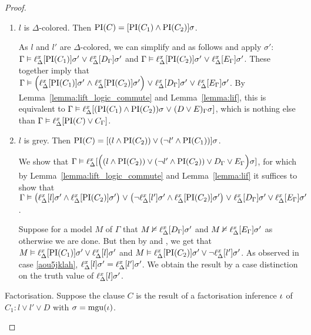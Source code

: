 {\begin{proof}
\begin{description}
\begin{enumerate}
				\item $l$ is $\Delta$-colored. Then $\operatorname{PI}(C) = [\operatorname{PI}(C_1) \land \operatorname{PI}(C_2)]\sigma$.

					As $l$ and $l'$ are $\Delta$-colored, we can simplify \markA{} and \markB{} as follows and apply $\sigma'$:
					$\Gamma \vDash \ell_{\Delta}^{x}[\operatorname{PI}(C_1)]\sigma' \;{\lor}\; \ell_{\Delta}^{x}[D_\Gamma]\sigma' $ and $\Gamma \vDash \ell_{\Delta}^{x}[\operatorname{PI}(C_2)]\sigma' \;{\lor}\; \ell_{\Delta}^{x}[E_\Gamma]\sigma'$.
					These together imply that 
					$\Gamma \vDash \Big(\ell_{\Delta}^{x}[\operatorname{PI}(C_1)]\sigma' \;{\land}\; \ell_{\Delta}^{x}[\operatorname{PI}(C_2)]\sigma'\Big) \;{\lor}\;\allowbreak \ell_{\Delta}^{x}[D_\Gamma]\sigma' \;{\lor}\;\allowbreak \ell_{\Delta}^{x}[E_\Gamma]\sigma'$.
					By Lemma~\ref{lemma:lift_logic_commute} and Lemma~\ref{lemma:lif}, this is equivalent to 
					$\Gamma \vDash \ell_{\Delta}^{x}[(\operatorname{PI}(C_1) \land \operatorname{PI}(C_2))\sigma \;{\lor}\; (D \lor E)_\Gamma\sigma]$, which is nothing else than
					$\Gamma \vDash \ell_{\Delta}^{x}[\operatorname{PI}(C) \lor C_\Gamma]$.

				\item $l$ is grey. Then $\operatorname{PI}(C) = [(l \land \operatorname{PI}(C_2) ) \lor (\lnot l' \land \operatorname{PI}(C_1))]\sigma$.

					We show that $\Gamma \vDash\allowbreak \ell_{\Delta}^{x}[ \Big((l \land \operatorname{PI}(C_2) ) \lor\allowbreak (\lnot l' \land \operatorname{PI}(C_2)) \lor D_\Gamma \lor E_\Gamma\Big)\sigma]$, for which by Lemma~\ref{lemma:lift_logic_commute} and Lemma~\ref{lemma:lif} it suffices to show that 
					$\Gamma \vDash\allowbreak \big(\ell_{\Delta}^{x}[l]\sigma' \land \ell_{\Delta}^{x}[\operatorname{PI}(C_2)]\sigma'\big)\;{\lor}\;\allowbreak \big(\lnot \ell_{\Delta}^{x}[l']\sigma' \land \ell_{\Delta}^{x}[\operatorname{PI}(C_2)]\sigma'\big)\;{\lor}\;\allowbreak \ell_{\Delta}^{x}[D_\Gamma]\sigma' \lor \ell_{\Delta}^{x}[E_\Gamma]\sigma'$.

					Suppose for a model $M$ of $\Gamma$ that  $M \nvDash \ell_{\Delta}^{x}[D_\Gamma]\sigma'$ and $M\nvDash \ell_{\Delta}^{x}[E_\Gamma]\sigma'$ as otherwise we are done.
					But then by \markA{} and \markB{}, we get that 
					$M \vDash \ell_{\Delta}^{x}[\operatorname{PI}(C_1)]\sigma' \lor \ell_{\Delta}^{x}[l]\sigma'$ and
					$M \entails\nolinebreak \lifdelta{\PI(C_2)}\sigma' \lor \lnot\lifdelta{l'}\sigma'$.
					As observed in case \ref{aou5jklah}, $\ell_{\Delta}^{x}[l]\sigma' = \ell_{\Delta}^{x}[l']\sigma'$.
					We obtain the result by a case distinction on the truth value of $\ell_{\Delta}^{x}[l]\sigma'$.

			\end{enumerate}

		\item{Factorisation.}
			Suppose the clause $C$ is the result of a factorisation inference $\iota$ of $C_1: l \lor l' \lor D$ with $\sigma=\operatorname{mgu}(\iota)$.


\end{description}
\end{proof}}
